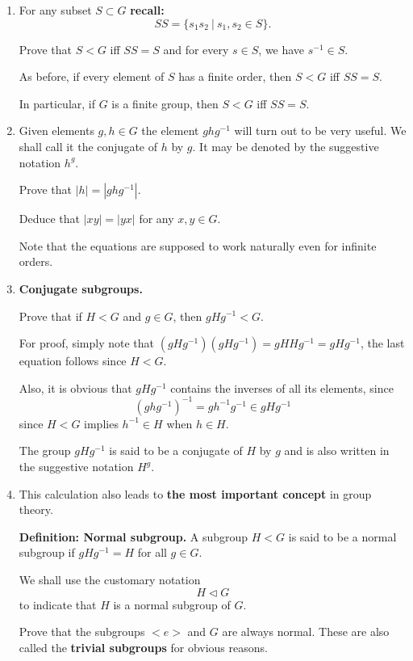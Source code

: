 \documentclass[12pt]{article}
\newcommand{\deff}[1]{{\bf Definition: #1} }
\begin{document}
\begin{enumerate}
\item For any subset $S\subset G$ {\bf recall:}
$$SS= \{s_1s_2 ~|~ s_1,s_2\in S\}.$$

Prove that $S<G$ iff $SS=S$ and for every $s\in S$, we have $s^{-1}\in
S$.

As before, if every element of $S$ has a finite order, then $S<G$ iff
$SS=S$.

In particular, if $G$ is a finite group, then $S<G$ iff $SS=S$.

\item Given elements $g,h\in G$ the element $ghg^{-1}$ will turn out to
be very useful. We shall call it the conjugate of $h$ by $g$. It may be
denoted by the suggestive notation $h^g$.

Prove that $|h| = |ghg^{-1}|$.

Deduce that $|xy|=|yx|$ for any $x,y\in G$.

Note that the equations are supposed to work naturally even for infinite orders.

\item {\bf Conjugate subgroups.}


Prove that if $H<G$ and $g\in G$, then $gHg^{-1} <G$.

For proof, simply note that $(gHg^{-1})(gHg^{-1}) = gHHg^{-1} =
gHg^{-1}$, the last equation follows since $H<G$.

Also, it is obvious that $gHg^{-1}$ contains the inverses of all its
elements, since 
$$\left(ghg^{-1}\right)^{-1}= gh^{-1}g^{-1}\in gHg^{-1}$$
since $H<G$ implies $h^{-1}\in H$ when $h\in H$.

The group $gHg^{-1}$ is said to be a conjugate of $H$ by $g$ and is also
written in the suggestive notation $H^g$.

\item 
This calculation also leads to {\bf the most important concept} in group
theory.

\deff{Normal subgroup.}
A subgroup $H<G$ is said to be a normal subgroup if $gHg^{-1}=H$ for all
$g\in G$.

We shall use the customary notation $$H\vartriangleleft G$$ to indicate 
that $H$ is a normal subgroup of $G$.

Prove that the subgroups $<e>$ and $G$ are always normal.
These are also called the {\bf trivial subgroups} for obvious reasons.



\end{enumerate}
\end{document}
